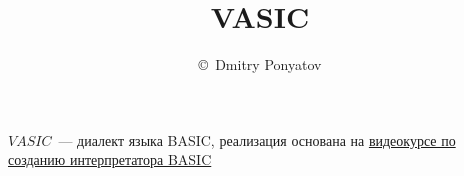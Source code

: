 
\title{VASIC}
\author{\copyright\ Dmitry Ponyatov }
\newcommand{\vasic}{$VASIC$}

\maketitle
\tableofcontents
{}

\vasic\ --- диалект языка BASIC, реализация основана на \href{https://www.youtube.com/playlist?list=PLBOh8f9FoHHiKx3ZCPxOZWUtZswrj2zI0}{видеокурсе по созданию
интерпретатора BASIC}


